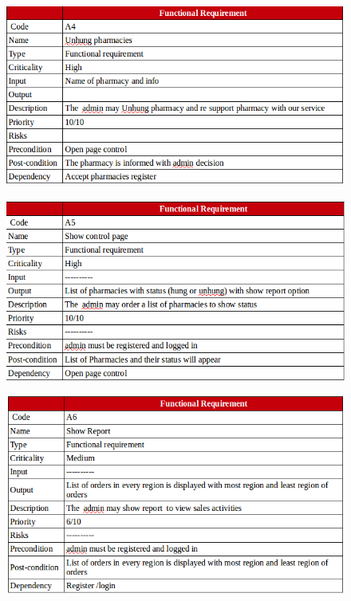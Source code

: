 \documentclass[]{article}
\begin{document}
\begin{figure}[H]
\centering
\includegraphics[scale=0.4]{./f/12}
\end{figure}

\begin{figure}[H]
\centering
\includegraphics[scale=0.4]{./f/13}
\end{figure}

\begin{figure}[H]
\centering
\includegraphics[scale=0.4]{./f/14}
\end{figure}
\end{document}

